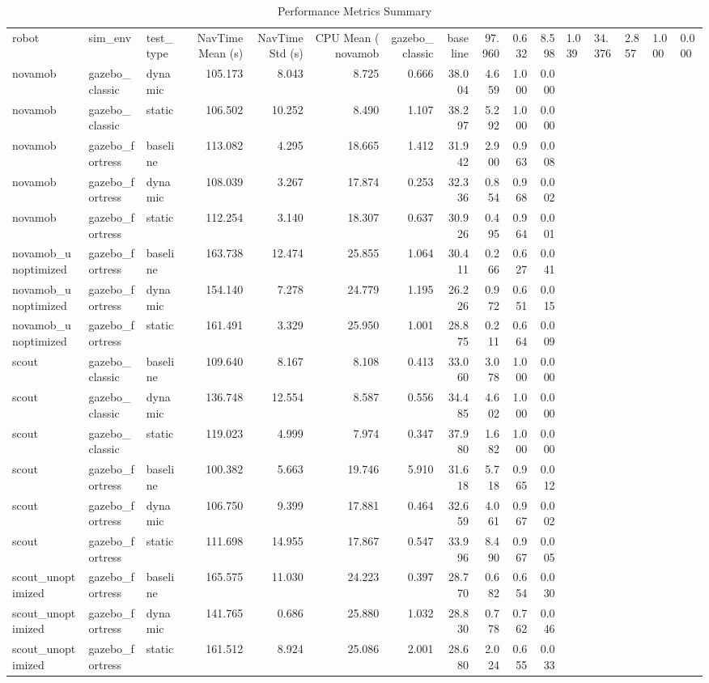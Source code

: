 \begin{table}
\caption{Performance Metrics Summary}
\label{tab:summary_results}
\begin{tabular}{lllrrrrrrrr}
\toprule
robot & sim\_env & test\_type & NavTime Mean (s) & NavTime Std (s) & CPU Mean (%
\midrule
novamob & gazebo_classic & baseline & 97.960 & 0.632 & 8.598 & 1.039 & 34.376 & 2.857 & 1.000 & 0.000 \\
novamob & gazebo_classic & dynamic & 105.173 & 8.043 & 8.725 & 0.666 & 38.004 & 4.659 & 1.000 & 0.000 \\
novamob & gazebo_classic & static & 106.502 & 10.252 & 8.490 & 1.107 & 38.297 & 5.292 & 1.000 & 0.000 \\
novamob & gazebo_fortress & baseline & 113.082 & 4.295 & 18.665 & 1.412 & 31.942 & 2.900 & 0.963 & 0.008 \\
novamob & gazebo_fortress & dynamic & 108.039 & 3.267 & 17.874 & 0.253 & 32.336 & 0.854 & 0.968 & 0.002 \\
novamob & gazebo_fortress & static & 112.254 & 3.140 & 18.307 & 0.637 & 30.926 & 0.495 & 0.964 & 0.001 \\
novamob_unoptimized & gazebo_fortress & baseline & 163.738 & 12.474 & 25.855 & 1.064 & 30.411 & 0.266 & 0.627 & 0.041 \\
novamob_unoptimized & gazebo_fortress & dynamic & 154.140 & 7.278 & 24.779 & 1.195 & 26.226 & 0.972 & 0.651 & 0.015 \\
novamob_unoptimized & gazebo_fortress & static & 161.491 & 3.329 & 25.950 & 1.001 & 28.875 & 0.211 & 0.664 & 0.009 \\
scout & gazebo_classic & baseline & 109.640 & 8.167 & 8.108 & 0.413 & 33.060 & 3.078 & 1.000 & 0.000 \\
scout & gazebo_classic & dynamic & 136.748 & 12.554 & 8.587 & 0.556 & 34.485 & 4.602 & 1.000 & 0.000 \\
scout & gazebo_classic & static & 119.023 & 4.999 & 7.974 & 0.347 & 37.980 & 1.682 & 1.000 & 0.000 \\
scout & gazebo_fortress & baseline & 100.382 & 5.663 & 19.746 & 5.910 & 31.618 & 5.718 & 0.965 & 0.012 \\
scout & gazebo_fortress & dynamic & 106.750 & 9.399 & 17.881 & 0.464 & 32.659 & 4.061 & 0.967 & 0.002 \\
scout & gazebo_fortress & static & 111.698 & 14.955 & 17.867 & 0.547 & 33.996 & 8.490 & 0.967 & 0.005 \\
scout_unoptimized & gazebo_fortress & baseline & 165.575 & 11.030 & 24.223 & 0.397 & 28.770 & 0.682 & 0.654 & 0.030 \\
scout_unoptimized & gazebo_fortress & dynamic & 141.765 & 0.686 & 25.880 & 1.032 & 28.830 & 0.778 & 0.762 & 0.046 \\
scout_unoptimized & gazebo_fortress & static & 161.512 & 8.924 & 25.086 & 2.001 & 28.680 & 2.024 & 0.655 & 0.033 \\
\bottomrule
\end{tabular}
\end{table}
